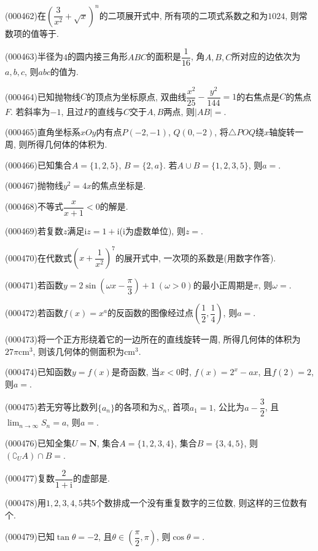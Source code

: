 \item (000462)在$(\dfrac3{x^2}+\sqrt{x})^n$的二项展开式中, 所有项的二项式系数之和为$1024$, 则常数项的值等于.
\item (000463)半径为$4$的圆内接三角形$ABC$的面积是$\dfrac1{16}$, 角$A,B,C$所对应的边依次为$a,b,c$, 则$abc$的值为.
\item (000464)已知抛物线$C$的顶点为坐标原点, 双曲线$\dfrac{x^2}{25}-\dfrac{y^2}{144}=1$的右焦点是$C$的焦点$F$. 若斜率为$-1$, 且过$F$的直线与$C$交于$A,B$两点, 则$|AB|=$.
\item (000465)直角坐标系$xOy$内有点$P(-2,-1)$, $Q(0,-2)$, 将$\triangle POQ$绕$x$轴旋转一周, 则所得几何体的体积为.
\item (000466)已知集合$A=\{1,2,5\}$, $B=\{2,a\}$. 若$A\cup B=\{1,2,3,5\}$, 则$a=$.
\item (000467)抛物线$y^2=4x$的焦点坐标是.
\item (000468)不等式$\dfrac x{x+1}<0$的解是.
\item (000469)若复数$z$满足$\mathrm{i}z=1+\mathrm{i}$($\mathrm{i}$为虚数单位), 则$z=$.
\item (000470)在代数式$(x+\dfrac 1{x^2})^7$的展开式中, 一次项的系数是(用数字作答).
\item (000471)若函数$y=2\sin (\omega x-\dfrac\pi 3)+1 \ (\omega >0)$的最小正周期是$\pi$, 则$\omega=$.
\item (000472)若函数$f(x)=x^a$的反函数的图像经过点$(\dfrac12,\dfrac14)$, 则$a=$.
\item (000473)将一个正方形绕着它的一边所在的直线旋转一周, 所得几何体的体积为$27\pi\text{cm}^3$, 则该几何体的侧面积为$\text{cm}^3$.
\item (000474)已知函数$y=f(x)$是奇函数, 当$x<0$时, $f(x)=2^x-ax$, 且$f(2)=2$, 则$a=$.
\item (000475)若无穷等比数列$\{a_n\}$的各项和为$S_n$, 首项$a_1=1$, 公比为$a-\dfrac32$, 且$\displaystyle\lim_{n\to\infty}S_n=a$, 则$a=$.
\item (000476)已知全集$U=\mathbf{N}$, 集合$A=\{1,2,3,4\}$, 集合$B=\{3,4,5\}$, 则$(\complement_U A)\cap B=$.
\item (000477)复数$\dfrac2{1+\mathrm{i}}$的虚部是.
\item (000478)用$1,2,3,4,5$共$5$个数排成一个没有重复数字的三位数, 则这样的三位数有个.
\item (000479)已知$\tan \theta =-2$, 且$\theta \in (\dfrac\pi 2,\pi)$, 则$\cos\theta=$.
